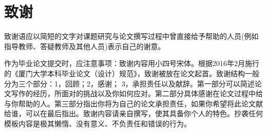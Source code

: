 
\chapter*{致谢} 

致谢语应以简短的文字对课题研究与论文撰写过程中曾直接给予帮助的人员(例如指导教师、答疑教师及其他人员)表示自己的谢意。
	
作为毕业论文提交时，应注意事项：致谢内容用小四号宋体。根据2016年2月施行的《厦门大学本科毕业论文（设计）规范》，致谢被放在论文起首。致谢结构一般分为三个部分：1，回顾；2，感谢； 3，承担责任以及献辞。第一部分可以简述论文写作的经历，所面对的挑战以及你如何应对。第二部分具体感谢在论文过程中给与你帮助的人。第三部分指出你将为自己的论文承担责任，如果你希望将此论文献给谁，可以在最后指出。致谢内容请亲自撰写，使其具备你个人的特色。抄袭任何模板内容是极其懒惰、没有意义、不负责任和错误的行为。
	
